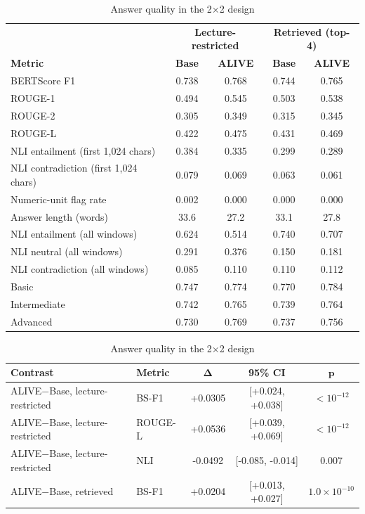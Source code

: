 \begin{table}[!htbp]
\centering
\caption{Answer quality in the 2$\times$2 design}
\label{tab:sup_2x2}
\small
\begin{tabular}{lcccc}
\toprule
& \multicolumn{2}{c}{\textbf{Lecture-restricted}} & \multicolumn{2}{c}{\textbf{Retrieved (top-4)}} \\
\textbf{Metric} & \textbf{Base} & \textbf{ALIVE} & \textbf{Base} & \textbf{ALIVE} \\
\midrule
BERTScore F1 & 0.738 & 0.768 & 0.744 & 0.765 \\
ROUGE-1 & 0.494 & 0.545 & 0.503 & 0.538 \\
ROUGE-2 & 0.305 & 0.349 & 0.315 & 0.345 \\
ROUGE-L & 0.422 & 0.475 & 0.431 & 0.469 \\
NLI entailment (first 1,024 chars) & 0.384 & 0.335 & 0.299 & 0.289 \\
NLI contradiction (first 1,024 chars) & 0.079 & 0.069 & 0.063 & 0.061 \\
Numeric-unit flag rate & 0.002 & 0.000 & 0.000 & 0.000 \\
Answer length (words) & 33.6 & 27.2 & 33.1 & 27.8 \\
NLI entailment (all windows) & 0.624 & 0.514 & 0.740 & 0.707 \\
NLI neutral (all windows) & 0.291 & 0.376 & 0.150 & 0.181 \\
NLI contradiction (all windows) & 0.085 & 0.110 & 0.110 & 0.112 \\
\midrule
Basic & 0.747 & 0.774 & 0.770 & 0.784 \\
Intermediate & 0.742 & 0.765 & 0.739 & 0.764 \\
Advanced & 0.730 & 0.769 & 0.737 & 0.756 \\
\bottomrule
\end{tabular}
\par\medskip
\begin{tabular}{llccc}
\toprule
\textbf{Contrast} & \textbf{Metric} & $\boldsymbol{\Delta}$ & \textbf{95\% CI} & $\boldsymbol{p}$ \\
\midrule
ALIVE$-$Base, lecture-restricted & BS-F1 & +0.0305 & [+0.024, +0.038] & $<10^{-12}$ \\
ALIVE$-$Base, lecture-restricted & ROUGE-L & +0.0536 & [+0.039, +0.069] & $<10^{-12}$ \\
ALIVE$-$Base, lecture-restricted & NLI & -0.0492 & [-0.085, -0.014] & 0.007 \\
ALIVE$-$Base, retrieved & BS-F1 & +0.0204 & [+0.013, +0.027] & $1.0{\times}10^{-10}$ \\

\end{tabular}
\end{table}
